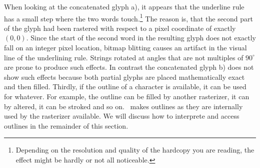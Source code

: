 When looking at the concatenated glyph a), it appears that the underline rule
has a small step where the two words touch.\footnote{Depending on the
  resolution and quality of the hardcopy you are reading, the effect might be
  hardly or not all noticeable.} The reason is, that the second part of the
glyph had been rastered with respect to a pixel coordinate of exactly $(0,0)$.
Since the start of the second word in the resulting glyph does not exactly
fall on an integer pixel location, bitmap blitting causes an artifact in the
visual line of the underlining rule. Strings rotated at angles that are not
multiples of $90^\circ$ are prone to produce such effects. In contrast the
concatenated glyph b) does not show such effects because both partial glyphs
are placed mathematically exact and then filled. Thirdly, if the outline of a
character is available, it can be used for whatever. For example, the outline
can be filled by another rasterizer, it can by altered, it can be stroked and
so on. \tonelib\ makes outlines as they are internally used by the rasterizer
available. We will discuss how to interprete and access outlines in the
remainder of this section.
